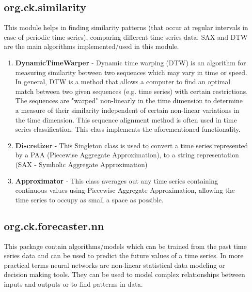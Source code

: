 \documentclass[12pt,a4paper]{report}
\begin{document}
\subsection{org.ck.similarity}
This module helps in finding similarity patterns (that occur at regular intervals in case of periodic time series), comparing different time series data. SAX and DTW are the main algorithms implemented/used in this module.

\begin{enumerate}
\item{\textbf{DynamicTimeWarper} - Dynamic time warping (DTW) is an algorithm for measuring similarity between two sequences which may vary in time or speed. In general, DTW is a method that allows a computer to find an optimal match between two given sequences (e.g. time series) with certain restrictions. The sequences are "warped" non-linearly in the time dimension to determine a measure of their similarity independent of certain non-linear variations in the time dimension. This sequence alignment method is often used in time series classification. This class implements the aforementioned functionality.}

\item{\textbf{Discretizer} - This Singleton class is used to convert a time series represented by a PAA (Piecewise Aggregate Approximation), to a string representation (SAX - Symbolic Aggregate Approximation)}

\item{\textbf{Approximator} - This class averages out any time series containing continuous values using Piecewise Aggregate Approximation, allowing the time series to occupy as small a space as possible.}

\end{enumerate}


\subsection{org.ck.forecaster.nn}

This package contain algorithms/models which can be trained from the past time series data and can be used to predict the future values of a time series. In more practical terms neural networks are non-linear statistical data modeling or decision making tools. They can be used to model complex relationships between inputs and outputs or to find patterns in data.
\end{document}
